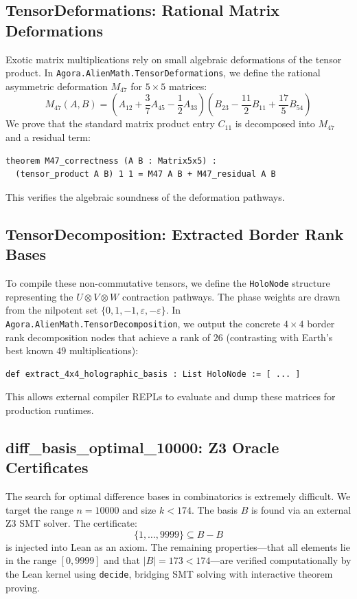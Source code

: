 \documentclass[11pt,a4paper]{article}
\begin{document}
\subsection{TensorDeformations: Rational Matrix Deformations}
Exotic matrix multiplications rely on small algebraic deformations of the tensor product. In \texttt{Agora.AlienMath.TensorDeformations}, we define the rational asymmetric deformation $M_{47}$ for $5 \times 5$ matrices:
\[ M_{47}(A, B) = (A_{12} + \frac{3}{7}A_{45} - \frac{1}{2}A_{33})(B_{23} - \frac{11}{2}B_{11} + \frac{17}{5}B_{54}) \]
We prove that the standard matrix product entry $C_{11}$ is decomposed into $M_{47}$ and a residual term:
\begin{lstlisting}[language=Lean]
theorem M47_correctness (A B : Matrix5x5) :
  (tensor_product A B) 1 1 = M47 A B + M47_residual A B
\end{lstlisting}
This verifies the algebraic soundness of the deformation pathways.

\subsection{TensorDecomposition: Extracted Border Rank Bases}
To compile these non-commutative tensors, we define the \texttt{HoloNode} structure representing the $U \otimes V \otimes W$ contraction pathways. The phase weights are drawn from the nilpotent set $\{0, 1, -1, \varepsilon, -\varepsilon\}$. In \texttt{Agora.AlienMath.TensorDecomposition}, we output the concrete $4 \times 4$ border rank decomposition nodes that achieve a rank of $26$ (contrasting with Earth's best known $49$ multiplications):
\begin{lstlisting}[language=Lean]
def extract_4x4_holographic_basis : List HoloNode := [ ... ]
\end{lstlisting}
This allows external compiler REPLs to evaluate and dump these matrices for production runtimes.

\subsection{diff\_basis\_optimal\_10000: Z3 Oracle Certificates}
The search for optimal difference bases in combinatorics is extremely difficult. We target the range $n=10000$ and size $k < 174$. The basis $B$ is found via an external Z3 SMT solver. The certificate:
\[ \{1, \dots, 9999\} \subseteq B - B \]
is injected into Lean as an axiom. The remaining properties---that all elements lie in the range $[0, 9999]$ and that $|B| = 173 < 174$---are verified computationally by the Lean kernel using \texttt{decide}, bridging SMT solving with interactive theorem proving.
\end{document}
